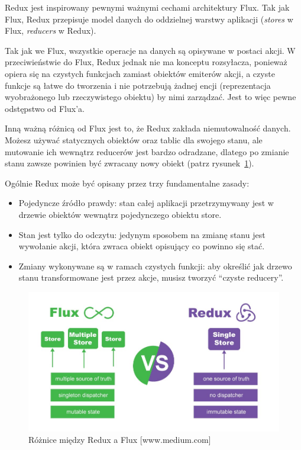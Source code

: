 Redux jest inspirowany pewnymi ważnymi cechami architektury Flux.
Tak jak Flux, Redux przepisuje model danych do oddzielnej warstwy aplikacji
(\textit{stores} w Flux, \textit{reducers} w Redux).

Tak jak we Flux, wszystkie operacje na danych są opisywane w postaci akcji.
W przeciwieństwie do Flux, Redux jednak nie ma konceptu rozsyłacza,
ponieważ opiera się na czystych funkcjach zamiast obiektów emiterów akcji,
a czyste funkcje są łatwe do tworzenia i nie potrzebują żadnej encji
(reprezentacja wyobrażonego lub rzeczywistego obiektu) by nimi zarządzać.
Jest to więc pewne odstępstwo od Flux’a.
~\cite{www_nafrontendzie}

Inną ważną różnicą od Flux jest to, że Redux zakłada niemutowalność danych.
Możesz używać statycznych obiektów oraz tablic dla swojego stanu,
ale mutowanie ich wewnątrz reducerów jest bardzo odradzane,
dlatego po zmianie stanu zawsze powinien być zwracany nowy obiekt (patrz rysunek~\ref{rys:reduxFlux}).

Ogólnie Redux może być opisany przez trzy fundamentalne zasady:
\begin{itemize}
	\item Pojedyncze źródło prawdy: stan całej aplikacji przetrzymywany jest
	w drzewie obiektów wewnątrz pojedynczego obiektu store.
	\item Stan jest tylko do odczytu: jedynym sposobem na zmianę stanu jest wywołanie akcji,
	która zwraca obiekt opisujący co powinno się stać.
	\item Zmiany wykonywane są w ramach czystych funkcji: aby określić jak drzewo stanu
	transformowane jest przez akcje, musisz tworzyć ``czyste reducery''.
\end{itemize}

\begin{figure}
	\centering\includegraphics[width=.6\textwidth]{img/reduxFlux}
	\caption{Różnice między Redux a Flux [www.medium.com]}\label{rys:reduxFlux}%
\end{figure}


